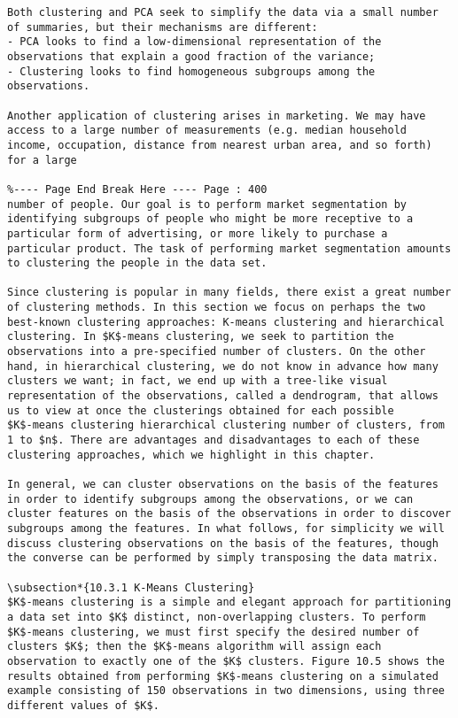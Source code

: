 \documentclass[10pt]{article}
\begin{document}
\begin{verbatim}
Both clustering and PCA seek to simplify the data via a small number of summaries, but their mechanisms are different:
- PCA looks to find a low-dimensional representation of the observations that explain a good fraction of the variance;
- Clustering looks to find homogeneous subgroups among the observations.

Another application of clustering arises in marketing. We may have access to a large number of measurements (e.g. median household income, occupation, distance from nearest urban area, and so forth) for a large

%---- Page End Break Here ---- Page : 400
number of people. Our goal is to perform market segmentation by identifying subgroups of people who might be more receptive to a particular form of advertising, or more likely to purchase a particular product. The task of performing market segmentation amounts to clustering the people in the data set.

Since clustering is popular in many fields, there exist a great number of clustering methods. In this section we focus on perhaps the two best-known clustering approaches: K-means clustering and hierarchical clustering. In $K$-means clustering, we seek to partition the observations into a pre-specified number of clusters. On the other hand, in hierarchical clustering, we do not know in advance how many clusters we want; in fact, we end up with a tree-like visual representation of the observations, called a dendrogram, that allows us to view at once the clusterings obtained for each possible
$K$-means clustering hierarchical clustering number of clusters, from 1 to $n$. There are advantages and disadvantages to each of these clustering approaches, which we highlight in this chapter.

In general, we can cluster observations on the basis of the features in order to identify subgroups among the observations, or we can cluster features on the basis of the observations in order to discover subgroups among the features. In what follows, for simplicity we will discuss clustering observations on the basis of the features, though the converse can be performed by simply transposing the data matrix.

\subsection*{10.3.1 K-Means Clustering}
$K$-means clustering is a simple and elegant approach for partitioning a data set into $K$ distinct, non-overlapping clusters. To perform $K$-means clustering, we must first specify the desired number of clusters $K$; then the $K$-means algorithm will assign each observation to exactly one of the $K$ clusters. Figure 10.5 shows the results obtained from performing $K$-means clustering on a simulated example consisting of 150 observations in two dimensions, using three different values of $K$.


\end{verbatim}
\end{document}
